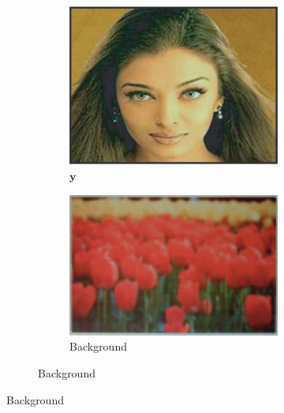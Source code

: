 \begin{figure}
    \centering    
    \begin{subfigure}{0.8\textwidth}
        \centering
        \begin{subfigure}{0.34\textwidth}
            \centering
            \includegraphics[width=\textwidth]{images/01-desired_appearance.png}
            \caption{\(\bm{y}\)}
            \label{fig:intro_grossberg-desired_appearance}
        \end{subfigure}
        \hfill
        \begin{subfigure}{0.24\textwidth}
            \centering
            \includegraphics[width=\textwidth]{images/01-background.png}
            \caption{Background}
            \label{fig:intro_grossberg-background}
        \end{subfigure}

\end{subfigure}
\end{figure}
